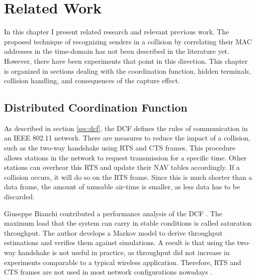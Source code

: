 
\chapter{Related Work}\label{ch:relatedwork}
\glsresetall %

In this chapter I present related research and relevant previous work. The proposed technique of recognizing senders in a collision by correlating their \gls{MAC} addresses in the time-domain has not been described in the literature yet. However, there have been experiments that point in this direction. This chapter is organized in sections dealing with the coordination function, hidden terminals, collision handling, and consequences of the capture effect.



\section{Distributed Coordination Function}\label{sec:related-dcf}

As described in section \ref{sec:dcf}, the \gls{DCF} defines the rules of communication in an IEEE 802.11 network. There are measures to reduce the impact of a collision, such as the two-way handshake using \gls{RTS} and \gls{CTS} frames. This procedure allows stations in the network to request transmission for a specific time. Other stations can overhear this \gls{RTS} and update their \gls{NAV} tables accordingly. If a collision occurs, it will do so on the \gls{RTS} frame. Since this is much shorter than a data frame, the amount of unusable air-time is smaller, as less data has to be discarded.

Giuseppe Bianchi contributed a performance analysis of the \gls{DCF} \cite{bianchi2000}. The maximum load that the system can carry in stable conditions is called saturation throughput. The author develops a Markov model to derive throughput estimations and verifies them against simulations. A result is that using the two-way handshake is not useful in practice, as throughput did not increase in experiments comparable to a  typical wireless application. Therefore, \gls{RTS} and \gls{CTS} frames are not used in most network configurations nowadays \cite{bianchi2000, gollakota2008, choi2013}.\\

